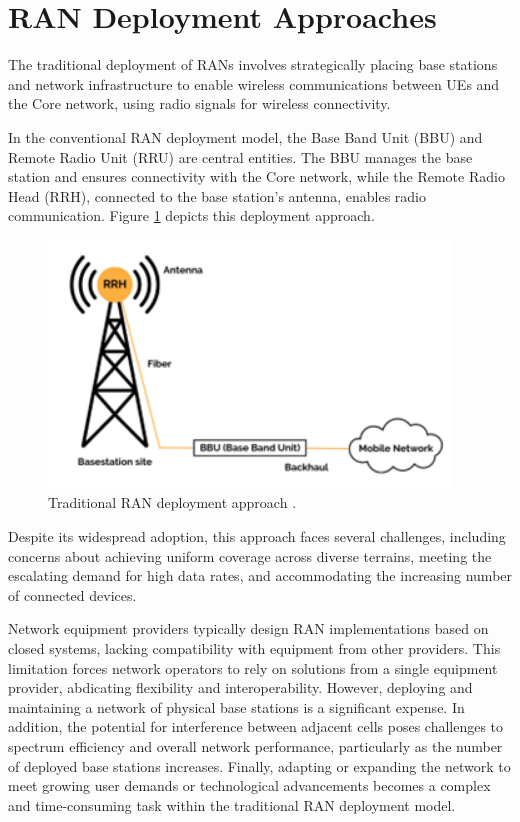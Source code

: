 \section{RAN Deployment Approaches} \label{sec:RAN}
The traditional deployment of RANs involves strategically placing base stations and network infrastructure to enable wireless communications between UEs and the Core network, using radio signals for wireless connectivity.

In the conventional RAN deployment model, the Base Band Unit (BBU) and Remote Radio Unit (RRU) are central entities. The BBU manages the base station and ensures connectivity with the Core network, while the Remote Radio Head (RRH), connected to the base station's antenna, enables radio communication. Figure  \ref{fig:rru_bbu} depicts this deployment approach. 

\begin{figure}[H]
    \centering
    \includegraphics[width=0.5\linewidth]{figures/RRU_BBU.png}
    \caption[Traditional RAN deployment approach]{Traditional RAN deployment approach \cite{Trad_RAN}.}
    \label{fig:rru_bbu}
\end{figure}

Despite its widespread adoption, this approach faces several challenges, including concerns about achieving uniform coverage across diverse terrains, meeting the escalating demand for high data rates, and accommodating the increasing number of connected devices.

Network equipment providers typically design RAN implementations based on closed systems, lacking compatibility with equipment from other providers. This limitation forces network operators to rely on solutions from a single equipment provider, abdicating flexibility and interoperability. However, deploying and maintaining a network of physical base stations is a significant expense. In addition, the potential for interference between adjacent cells poses challenges to spectrum efficiency and overall network performance, particularly as the number of deployed base stations increases. Finally, adapting or expanding the network to meet growing user demands or technological advancements becomes a complex and time-consuming task within the traditional RAN deployment model.

